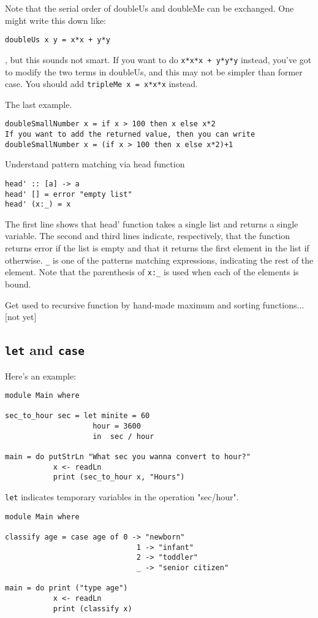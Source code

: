 Note that the serial order of doubleUs and doubleMe can be exchanged.
One might write this down like:
\begin{lstlisting}
doubleUs x y = x*x + y*y
\end{lstlisting}

, but this sounds not smart. If you want to do \lstinline{x*x*x + y*y*y} instead, you’ve got to modify the two terms in doubleUs, and this may not be simpler than former case. You should add \lstinline{tripleMe x = x*x*x} instead.

The last example.
\begin{lstlisting}
doubleSmallNumber x = if x > 100 then x else x*2
If you want to add the returned value, then you can write
doubleSmallNumber x = (if x > 100 then x else x*2)+1
\end{lstlisting}

Understand pattern matching via head function

\begin{lstlisting}
head' :: [a] -> a
head' [] = error "empty list"
head' (x:_) = x
\end{lstlisting}

The first line shows that head' function takes a single list and returns a single variable. 
The second and third lines indicate, respectively, 
that the function returns error if the list is empty and that it returns the first element in the list if otherwise. 
\lstinline{_} is one of the patterns matching expressions, indicating the rest of the element. 
Note that the parenthesis of \lstinline{x:_} is used when each of the elements is bound.

Get used to recursive function by hand-made maximum and sorting functions...[not yet]

\subsection{\lstinline{let} and \lstinline{case}}
Here’s an example:

\begin{lstlisting}
module Main where

sec_to_hour sec = let minite = 60
                    hour = 3600
                    in  sec / hour

main = do putStrLn "What sec you wanna convert to hour?"
           x <- readLn
           print (sec_to_hour x, "Hours")
\end{lstlisting}

\lstinline{let} indicates temporary variables in the operation "sec/hour". 
\begin{lstlisting}
module Main where

classify age = case age of 0 -> "newborn"
                              1 -> "infant"
                              2 -> "toddler"
                              _ -> "senior citizen"

main = do print ("type age")
           x <- readLn
           print (classify x)
\end{lstlisting}

